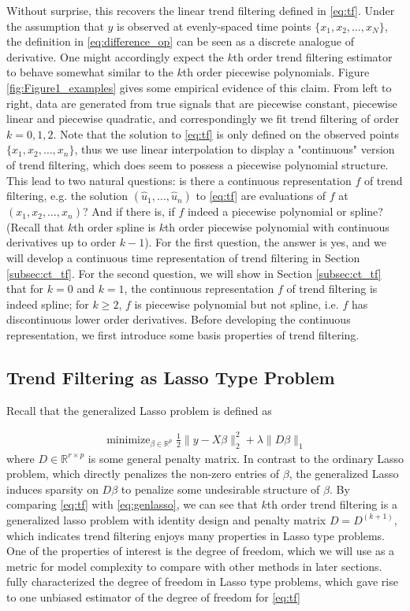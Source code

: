 \documentclass[a4paper]{article}
\newcommand{\RR}{\mathbb{R}}
\DeclareMathOperator*{\minimize}{minimize}
\begin{document}
Without surprise, this recovers the linear trend filtering defined in \eqref{eq:tf}. Under the assumption that $y$ is observed at evenly-spaced time points $\{x_1,x_2,\ldots, x_N\}$, the definition in \eqref{eq:difference_op} can be seen as a discrete analogue of derivative. One might accordingly expect the $k$th order trend filtering estimator to behave somewhat similar to the $k$th order piecewise polynomials. Figure \ref{fig:Figure1_examples} gives some empirical evidence of this claim. From left to right, data are generated from true signals that are piecewise constant, piecewise linear and piecewise quadratic, and correspondingly we fit trend filtering of order $k = 0,1,2$. Note that the solution to \eqref{eq:tf} is only defined on the observed points $\{x_1,x_2, \ldots, x_n\}$, thus we use linear interpolation to display a "continuous" version of trend filtering, which does seem to possess a piecewise polynomial structure. This lead to two natural questions: is there a continuous representation $f$ of trend filtering, e.g. the solution $(\hat{u}_1,\ldots, \hat{u}_n)$ to \eqref{eq:tf} are evaluations of $f$ at $(x_1, x_2,\ldots, x_n)$? And if there is, if $f$ indeed a piecewise polynomial or spline? (Recall that $k$th order spline is $k$th order piecewise polynomial with continuous derivatives up to order $k-1$). For the first question, the answer is yes, and we will develop a continuous time representation of trend filtering in Section \ref{subsec:ct_tf}. For the second question, we will show in Section \ref{subsec:ct_tf} that for $k=0$ and $k=1$, the continuous representation $f$ of trend filtering is indeed spline; for $k\geq 2$, $f$ is piecewise polynomial but not spline, i.e. $f$ has discontinuous lower order derivatives. Before developing the continuous representation, we first introduce some basis properties of trend filtering.

\subsection{Trend Filtering as Lasso Type Problem}
\label{subsec:tfaslasso}
Recall that the generalized Lasso problem is defined as

\begin{align}
\minimize_{\beta\in\RR^p} \frac{1}{2}\|y-X\beta\|_2^2 + \lambda\|D\beta\|_1 
\label{eq:genlasso}
\end{align}
where $D\in\RR^{r\times p}$ is some general penalty matrix. In contrast to the ordinary Lasso problem, which directly penalizes the non-zero entries of $\beta$, the generalized Lasso induces sparsity on $D\beta$ to penalize some undesirable structure of $\beta$. By comparing \eqref{eq:tf} with \eqref{eq:genlasso}, we can see that $k$th order trend filtering is a generalized lasso problem with identity design and penalty matrix $D = D^{(k+1)}$, which indicates trend filtering enjoys many properties in Lasso type problems. One of the properties of interest is the degree of freedom, which we will use as a metric for model complexity to compare with other methods in later sections. \cite{tibshirani2011solution} fully characterized the degree of freedom in Lasso type problems, which gave rise to one unbiased estimator of the degree of freedom for \eqref{eq:tf} 
\end{document}
